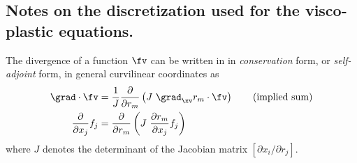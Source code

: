 \newcommand{\Es}{{\mathcal E}}
\newcommand{\ac}{k}
\newcommand{\Lrr}{{\mathcal L}_{rr}}
\newcommand{\Lrs}{{\mathcal L}_{rs}}
\newcommand{\dr}{{\Delta r}}
\newcommand{\ds}{{\Delta s}}
\newcommand{\hr}{h_r}
\newcommand{\hs}{h_s}
\newcommand{\Rand}{{\mathcal R}}
\newcommand{\SDm}{SD$m$}
\newcommand{\FDm}{FD$m$}
\newcommand{\TnSDm}[2]{T$#1$SD$#2$}
\newcommand{\TnFDm}[2]{T$#1$FD$#2$}
\newcommand{\Vlambda}{V_\lambda}

\clearpage
\subsection{Notes on the discretization used for the visco-plastic equations.}


The divergence of a function $\fv$ can be written in in {\em conservation} form, or {\em self-adjoint} form, 
in general curvilinear coordinates as
\begin{align}
  \grad\cdot\fv &= \frac{1}{J} {\partial \over\partial r_m} \left( J~\grad_\xv r_m\cdot\fv \right) 
                 \qquad\text{(implied sum)}
     \label{eq:divCons} \\
   {\partial\over\partial x_j} f_j &=  {\partial \over\partial r_m} 
           \left(J~  {\partial r_m\over\partial x_j} f_j \right)
\end{align}
where $J$ denotes the determinant of the Jacobian matrix $[\partial x_i/\partial r_j]$.

